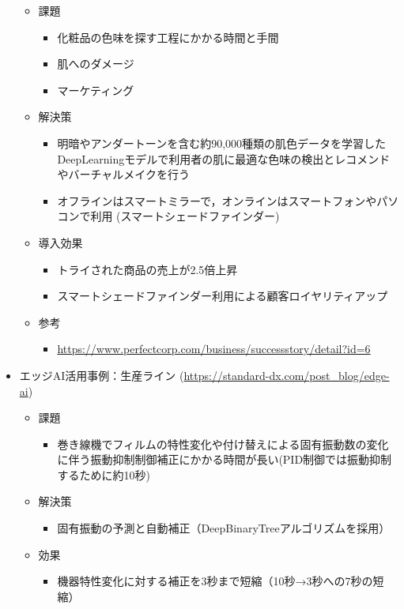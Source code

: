\begin{itemize}
	\begin{itemize}
		\item 課題
		\begin{itemize}
			\item 化粧品の色味を探す工程にかかる時間と手間
			\item 肌へのダメージ
			\item マーケティング
		\end{itemize}
		\item 解決策
		\begin{itemize}
			\item 明暗やアンダートーンを含む約90,000種類の肌色データを学習したDeepLearningモデルで利用者の肌に最適な色味の検出とレコメンドやバーチャルメイクを行う
			\item オフラインはスマートミラーで，オンラインはスマートフォンやパソコンで利用 (スマートシェードファインダー)
		\end{itemize}
		\item 導入効果
		\begin{itemize}
			\item トライされた商品の売上が2.5倍上昇
			\item スマートシェードファインダー利用による顧客ロイヤリティアップ
		\end{itemize}
		\item 参考
		\begin{itemize}
			\item \url{https://www.perfectcorp.com/business/successstory/detail?id=6}
		\end{itemize}
	\end{itemize}
	\item エッジAI活用事例：生産ライン (\url{https://standard-dx.com/post_blog/edge-ai})
	\begin{itemize}
		\item 課題
		\begin{itemize}
			\item 巻き線機でフィルムの特性変化や付け替えによる固有振動数の変化に伴う振動抑制制御補正にかかる時間が長い(PID制御では振動抑制するために約10秒)
		\end{itemize}
		\item 解決策
		\begin{itemize}
			\item 固有振動の予測と自動補正（DeepBinaryTreeアルゴリズムを採用）
		\end{itemize}
		\item 効果
		\begin{itemize}
			\item 機器特性変化に対する補正を3秒まで短縮（10秒→3秒への7秒の短縮）

\end{itemize}
\end{itemize}
\end{itemize}
